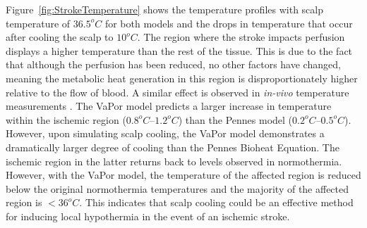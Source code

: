 \documentclass[11pt,english,a4paper,twoside,openright]{report}
\begin{document}
{{{{{{{Figure~\ref{fig:StrokeTemperature} shows the temperature profiles with scalp temperature of $36.5^{o}C$ for both models and the drops in temperature that occur after cooling the scalp to $10^{o}C$. The region where the stroke impacts perfusion displays a higher temperature than the rest of the tissue. This is due to the fact that although the perfusion has been reduced, no other factors have changed, meaning the metabolic heat generation in this region is disproportionately higher relative to the flow of blood. A similar effect is observed in \textit{in-vivo} temperature measurements \cite{marshall2006measurement}. The VaPor model predicts a larger increase in temperature within the ischemic region ($0.8^{o}C$--$1.2^{o}C$) than the Pennes model ($0.2^{o}C$--$0.5^{o}C$). However, upon simulating scalp cooling, the VaPor model demonstrates a dramatically larger degree of cooling than the Pennes Bioheat Equation. The ischemic region in the latter returns back to levels observed in normothermia. However, with the VaPor model, the temperature of the affected region is reduced below the original normothermia temperatures and the majority of the affected region is {$<$}$36^{o}C$. This indicates that scalp cooling could be an effective method for inducing local hypothermia in the event of an ischemic stroke.

}}}}}}}
\end{document}
